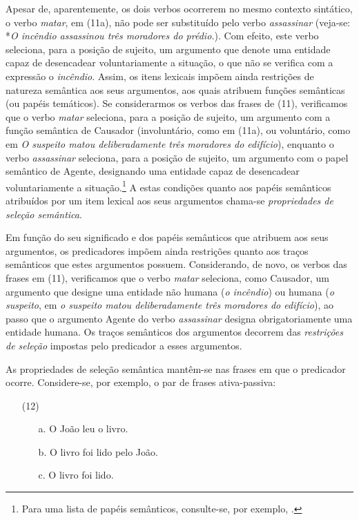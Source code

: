 \documentclass[output=paper,colorlinks,citecolor=brown,booklanguage=portuguese]{langscibook}
\begin{document}
Apesar de, aparentemente, os dois verbos ocorrerem no mesmo contexto sintático, o verbo \emph{matar}, em (11a), não pode ser substituído pelo verbo \emph{assassinar} (veja-se: *\emph{O incêndio assassinou três moradores do prédio.}). Com efeito, este verbo seleciona, para a posição de sujeito, um argumento que denote uma entidade capaz de desencadear voluntariamente a situação, o que não se verifica com a expressão o \emph{incêndio}. Assim, os itens lexicais impõem ainda restrições de natureza semântica aos seus argumentos, aos quais atribuem funções semânticas (ou papéis temáticos). Se considerarmos os verbos das frases de (11), verificamos que o verbo \emph{matar} seleciona, para a posição de sujeito, um argumento com a função semântica de Causador (involuntário, como em (11a), ou voluntário, como em \emph{O suspeito matou deliberadamente três moradores do edifício}), enquanto o verbo \emph{assassinar} seleciona, para a posição de sujeito, um argumento com o papel semântico de Agente, designando uma entidade capaz de desencadear voluntariamente a situação.\footnote{Para uma lista de papéis semânticos, consulte-se, por exemplo, \citet[188-190]{Duarte2003}.} A estas condições quanto aos papéis semânticos atribuídos por um item lexical aos seus argumentos chama-se \emph{propriedades de seleção semântica}. 

Em função do seu significado e dos papéis semânticos que atribuem aos seus argumentos, os predicadores impõem ainda restrições quanto aos traços semânticos que estes argumentos possuem. Considerando, de novo, os verbos das frases em (11), verificamos que o verbo \emph{matar} seleciona, como Causador, um argumento que designe uma entidade não humana (\emph{o incêndio}) ou humana (\emph{o suspeito}, em \emph{o suspeito matou deliberadamente três moradores do edifício}), ao passo que o argumento Agente do verbo \emph{assassinar} designa obrigatoriamente uma entidade humana. Os traços semânticos dos argumentos decorrem das \emph{restrições de seleção} impostas pelo predicador a esses argumentos.

As propriedades de seleção semântica mantêm-se nas frases em que o predicador ocorre. Considere-se, por exemplo, o par de frases ativa-passiva:

\begin{enumerate}[align=left]
    \item [(12)]
    \begin{enumerate}
        \item [a.] O João leu o livro.
	\item[b.] O livro foi lido pelo João.
	\item[c.]  O livro foi lido.
    \end{enumerate}
\end{enumerate}
\end{document}
